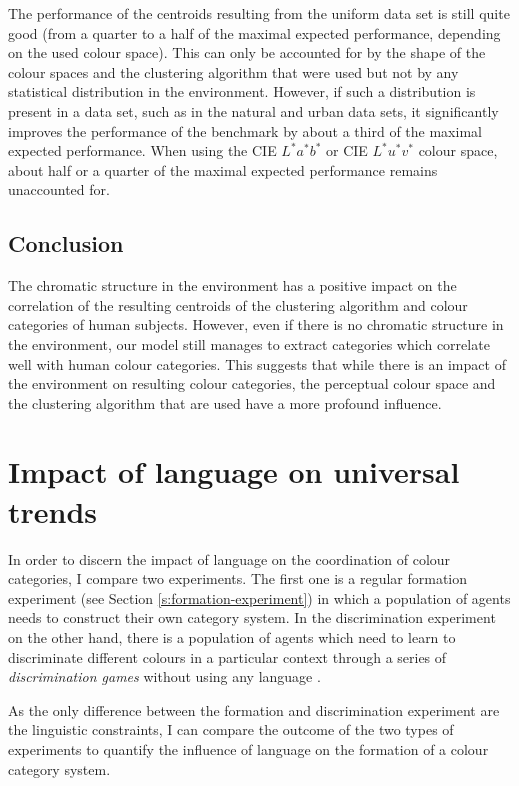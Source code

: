 The performance of the centroids resulting from the uniform data set
is still quite good (from a quarter to a half of the maximal expected
performance, depending on the used colour space). This can only be
accounted for by the shape of the colour spaces and the clustering
algorithm that were used but not by any statistical distribution in
the environment. However, if such a distribution is present in a data
set, such as in the natural and urban data sets, it significantly
improves the performance of the benchmark by about a third of the
maximal expected performance. When using the CIE $L^*a^*b^*$ or CIE
$L^*u^*v^*$ colour space, about half or a quarter of the maximal
expected performance remains unaccounted for.

\subsection{Conclusion}

The chromatic structure in the environment has a positive impact on
the correlation of the resulting centroids of the clustering algorithm
and colour categories of human subjects. However, even if there is no
chromatic structure in the environment, our model still manages to
extract categories which correlate well with human colour
categories. This suggests that while there is an impact of the
environment on resulting colour categories, the perceptual colour
space and the clustering algorithm that are used have a more profound
influence.

\section{Impact of language on universal trends}
\label{s:impact-of-language}

In order to discern the impact of language on the coordination of
colour categories, I compare two experiments. The first one is a
regular formation experiment (see Section
\ref{s:formation-experiment}) in which a population of agents needs to
construct their own category system. In the discrimination experiment
on the other hand, there is a population of agents which need to learn
to discriminate different colours in a particular context through a
series of \emph{discrimination games} without using any language
\citep{steels97constructing, belpaeme98construction}.

As the only difference between the formation and discrimination
experiment are the linguistic constraints, I can compare the outcome
of the two types of experiments to quantify the influence of language
on the formation of a colour category system.

